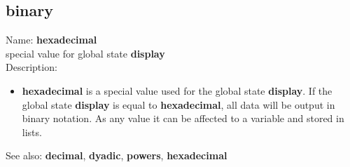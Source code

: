 \subsection{ binary }
\noindent Name: \textbf{hexadecimal}\\
special value for global state \textbf{display}\\

\noindent Description: \begin{itemize}

\item \textbf{hexadecimal} is a special value used for the global state \textbf{display}.  If
   the global state \textbf{display} is equal to \textbf{hexadecimal}, all data will be
   output in binary notation.
   As any value it can be affected to a variable and stored in lists.
\end{itemize}
See also: \textbf{decimal}, \textbf{dyadic}, \textbf{powers}, \textbf{hexadecimal}
